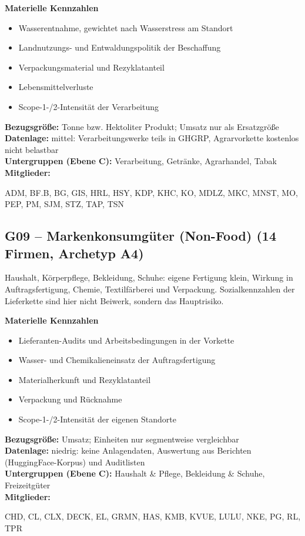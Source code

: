 \noindent\textbf{Materielle Kennzahlen}
\begin{itemize}[nosep,leftmargin=1.2em]
  \item Wasserentnahme, gewichtet nach Wasserstress am Standort
  \item Landnutzungs- und Entwaldungspolitik der Beschaffung
  \item Verpackungsmaterial und Rezyklatanteil
  \item Lebensmittelverluste
  \item Scope-1-/2-Intensität der Verarbeitung
\end{itemize}
\noindent\textbf{Bezugsgröße:} Tonne bzw. Hektoliter Produkt; Umsatz nur als Ersatzgröße\\
\textbf{Datenlage:} mittel: Verarbeitungswerke teils in GHGRP, Agrarvorkette kostenlos nicht belastbar\\
\textbf{Untergruppen (Ebene C):} Verarbeitung, Getränke, Agrarhandel, Tabak\\
\textbf{Mitglieder:} {\raggedright\small\ttfamily ADM, BF.B, BG, GIS, HRL, HSY, KDP, KHC, KO, MDLZ, MKC, MNST, MO, PEP, PM, SJM, STZ, TAP, TSN\par}

\medskip
\subsection*{G09 -- Markenkonsumgüter (Non-Food) \normalfont\small (14 Firmen, Archetyp A4)}
\noindent Haushalt, Körperpflege, Bekleidung, Schuhe: eigene Fertigung klein, Wirkung in Auftragsfertigung, Chemie, Textilfärberei und Verpackung. Sozialkennzahlen der Lieferkette sind hier nicht Beiwerk, sondern das Hauptrisiko.

\noindent\textbf{Materielle Kennzahlen}
\begin{itemize}[nosep,leftmargin=1.2em]
  \item Lieferanten-Audits und Arbeitsbedingungen in der Vorkette
  \item Wasser- und Chemikalieneinsatz der Auftragsfertigung
  \item Materialherkunft und Rezyklatanteil
  \item Verpackung und Rücknahme
  \item Scope-1-/2-Intensität der eigenen Standorte
\end{itemize}
\noindent\textbf{Bezugsgröße:} Umsatz; Einheiten nur segmentweise vergleichbar\\
\textbf{Datenlage:} niedrig: keine Anlagendaten, Auswertung aus Berichten (HuggingFace-Korpus) und Auditlisten\\
\textbf{Untergruppen (Ebene C):} Haushalt \& Pflege, Bekleidung \& Schuhe, Freizeitgüter\\
\textbf{Mitglieder:} {\raggedright\small\ttfamily CHD, CL, CLX, DECK, EL, GRMN, HAS, KMB, KVUE, LULU, NKE, PG, RL, TPR\par}

